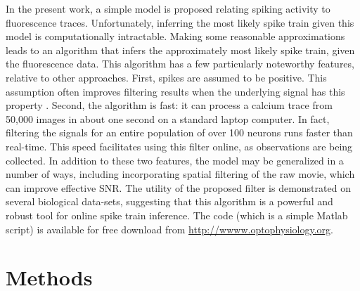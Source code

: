 In the present work, a simple model is proposed relating spiking activity to fluorescence traces. Unfortunately, inferring the most likely spike train given this model is computationally intractable.  Making some reasonable approximations leads to an algorithm that infers the approximately most likely spike train, given the fluorescence data.  This algorithm has a few particularly noteworthy features, relative to other approaches.  First, spikes are assumed to be positive.  This assumption often improves filtering results when the underlying signal has this property \cite{PortugalVicente94, MarkhamConchello99, LeeSeung99, LLS04, OGradyPearlmutter06, HuysPaninski06, Cunningham08, PaninskiWu09}.  Second, the algorithm is fast: it can process a calcium trace from 50,000 images in about one second on a standard laptop computer. In fact, filtering the signals for an entire population of over 100 neurons runs faster than real-time. This speed facilitates using this filter online, as observations are being collected. In addition to these two features, the model may be generalized in a number of ways, including incorporating spatial filtering of the raw movie, which can improve effective SNR. The utility of the proposed filter is demonstrated on several biological data-sets, suggesting that this algorithm is a powerful and robust tool for online spike train inference.  The code (which is a simple Matlab script) is available for free download from \url{http://wwww.optophysiology.org}.







\section{Methods} \label{sec:methods}



